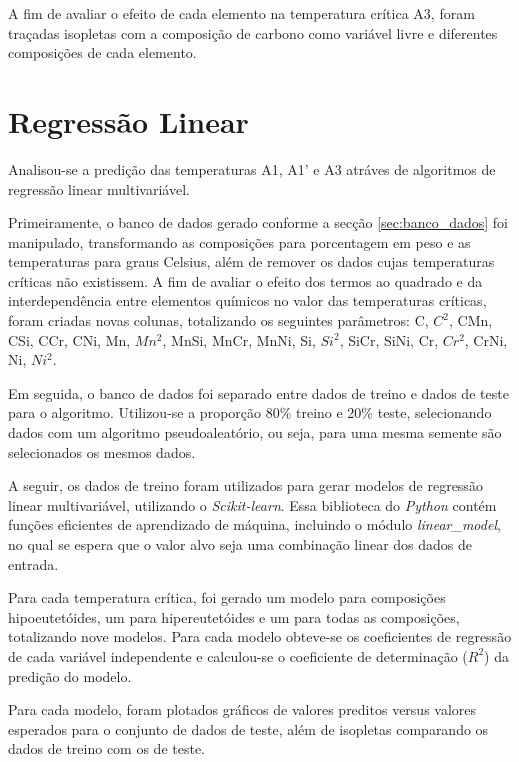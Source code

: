 \documentclass[brazil,tf,epusp]{usp}  %
\begin{document}
A fim de avaliar o efeito de cada elemento na temperatura crítica A3, foram traçadas isopletas com a composição de carbono como variável livre e diferentes composições de cada elemento.

\section{Regressão Linear}
\label{sec:metodo_RL}

Analisou-se a predição das temperaturas A1, A1' e A3 atráves de algoritmos de regressão linear multivariável.

Primeiramente, o banco de dados gerado conforme a secção \ref{sec:banco_dados} foi manipulado, transformando as composições para porcentagem em peso e as temperaturas para graus Celsius, além de remover os dados cujas temperaturas críticas não existissem. A fim de avaliar o efeito dos termos ao quadrado e da interdependência entre elementos químicos no valor das temperaturas críticas, foram criadas novas colunas, totalizando os seguintes parâmetros: C, $C^{2}$, CMn, CSi, CCr, CNi, Mn, $Mn^{2}$, MnSi, MnCr, MnNi, Si, $Si^{2}$, SiCr, SiNi, Cr, $Cr^{2}$, CrNi, Ni, $Ni^{2}$.

Em seguida, o banco de dados foi separado entre dados de treino e dados de teste para o algoritmo. Utilizou-se a proporção 80\% treino e 20\% teste, selecionando dados com um algoritmo pseudoaleatório, ou seja, para uma mesma semente são selecionados os mesmos dados.

A seguir, os dados de treino foram utilizados para gerar modelos de regressão linear multivariável, utilizando o \textit{Scikit-learn}. Essa biblioteca do \textit{Python} contém funções eficientes de aprendizado de máquina, incluindo o módulo \textit{linear\_model}, no qual se espera que o valor alvo seja uma combinação linear dos dados de entrada.

Para cada temperatura crítica, foi gerado um modelo para composições hipoeutetóides, um para hipereutetóides e um para todas as composições, totalizando nove modelos. Para cada modelo obteve-se os coeficientes de regressão de cada variável independente e calculou-se o coeficiente de determinação ($R^{2}$) da predição do modelo.

Para cada modelo, foram plotados gráficos de valores preditos versus valores esperados para o conjunto de dados de teste, além de isopletas comparando os dados de treino com os de teste.
\end{document}
